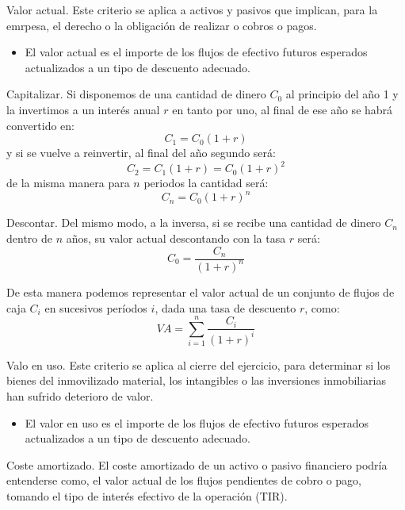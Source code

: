 Valor actual. 
Este criterio se aplica a activos y pasivos que implican, para la emrpesa, el derecho o la obligación de realizar o cobros o pagos.
\begin{itemize}
    \item El valor actual es el importe de los flujos de efectivo futuros esperados actualizados a un tipo de descuento adecuado.
\end{itemize}

Capitalizar.
Si disponemos de una cantidad de dinero $C_0$ al principio del año 1 y la invertimos a un interés anual $r$ en tanto por uno, al final de ese año se habrá convertido en:
\[ C_1 = C_0 (1 + r) \]
y si se vuelve a reinvertir, al final del año segundo será:
\[ C_2 = C_1 (1 + r) = C_0 (1 + r)^2 \]
de la misma manera para $n$ periodos la cantidad será:
\[ C_n = C_0 (1 + r)^n \]

Descontar.
Del mismo modo, a la inversa, si se recibe una cantidad de dinero $C_n$ dentro de $n$ años, su valor actual descontando con la tasa $r$ será:
\[ C_0 = \frac{C_n}{(1 + r)^n} \]

De esta manera podemos representar el valor actual de un conjunto de flujos de caja $C_i$ en sucesivos períodos $i$, dada una tasa de descuento $r$, como:
\[ VA = \sum_{i = 1}^{n} \frac{C_i}{(1 + r)^i} \]


Valo en uso.
Este criterio se aplica al cierre del ejercicio, para determinar si los bienes del inmovilizado material, los intangibles o las inversiones inmobiliarias han sufrido deterioro de valor.
\begin{itemize}
    \item El valor en uso es el importe de los flujos de efectivo futuros esperados actualizados a un tipo de descuento adecuado.
\end{itemize}

Coste amortizado.
El coste amortizado de un activo o pasivo financiero podría entenderse como, el valor actual de los flujos pendientes de cobro o pago, tomando el tipo de interés efectivo de la operación (TIR).

